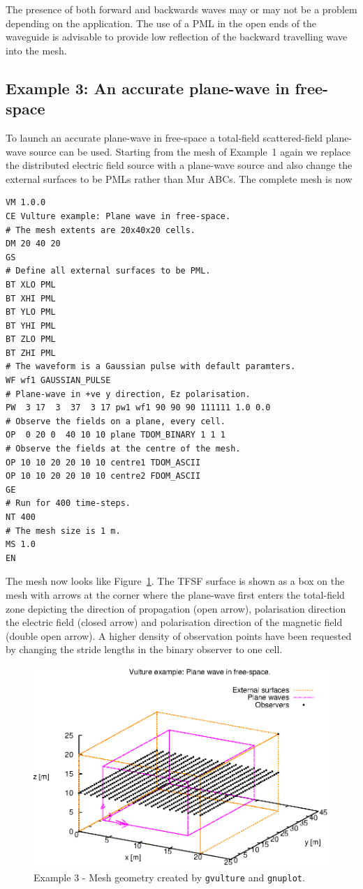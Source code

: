 \documentclass[onecolumn,a4paper]{article}
\numberwithin{equation}{section}
\begin{document}
The presence of both forward and backwards waves may or
may not be a problem depending on the application. The use of a PML in the open ends of
the waveguide is advisable to provide low reflection of the backward travelling wave into the mesh. 

\subsection{Example 3: An accurate plane-wave in free-space}

To launch an accurate plane-wave in free-space a total-field scattered-field plane-wave
source can be used. Starting from the mesh of Example~1 again we replace the distributed
electric field source with a plane-wave source and also change the external surfaces
to be PMLs rather than Mur ABCs. The complete mesh is now
\begin{verbatim}
VM 1.0.0
CE Vulture example: Plane wave in free-space.
# The mesh extents are 20x40x20 cells.
DM 20 40 20
GS
# Define all external surfaces to be PML.
BT XLO PML
BT XHI PML
BT YLO PML
BT YHI PML
BT ZLO PML
BT ZHI PML
# The waveform is a Gaussian pulse with default paramters.
WF wf1 GAUSSIAN_PULSE
# Plane-wave in +ve y direction, Ez polarisation.
PW  3 17  3  37  3 17 pw1 wf1 90 90 90 111111 1.0 0.0
# Observe the fields on a plane, every cell.
OP  0 20 0  40 10 10 plane TDOM_BINARY 1 1 1
# Observe the fields at the centre of the mesh.
OP 10 10 20 20 10 10 centre1 TDOM_ASCII
OP 10 10 20 20 10 10 centre2 FDOM_ASCII
GE
# Run for 400 time-steps.
NT 400 
# The mesh size is 1 m.
MS 1.0
EN
\end{verbatim}
The mesh now looks like Figure~\ref{fg:planewave_mesh}. The TFSF surface is shown as a box on the mesh
with arrows at the corner where the plane-wave first enters the total-field zone depicting the direction
of propagation (open arrow), polarisation direction the electric field (closed arrow) and polarisation
direction of the magnetic field (double open arrow). A higher density of observation points have been 
requested by changing the stride lengths in the binary observer to one cell.

\begin{figure}[ht]
\centerline{\includegraphics[width=12cm]{figures/planewave_mesh}}
\caption{\label{fg:planewave_mesh} Example 3 - Mesh geometry created by \texttt{gvulture} and \texttt{gnuplot}.}
\end{figure}
\end{document}
